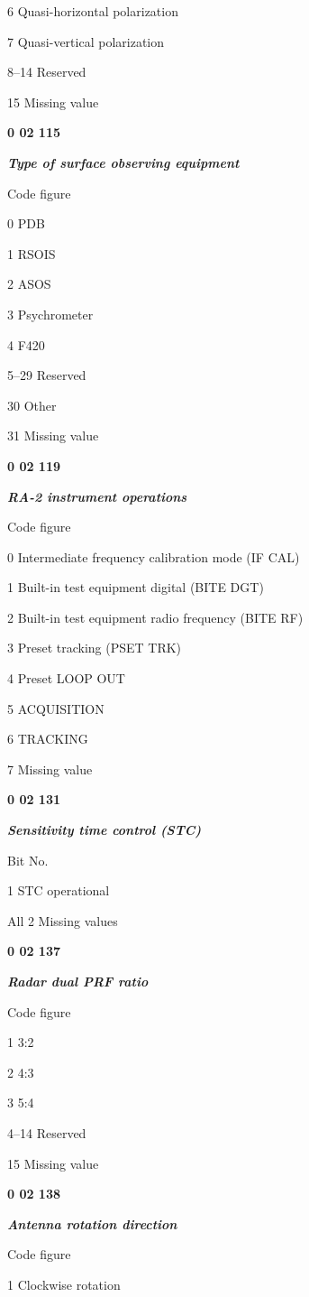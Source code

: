 6 Quasi-horizontal polarization

7 Quasi-vertical polarization

8--14 Reserved

15 Missing value

\textbf{0 02 115}

\emph{\textbf{Type of surface observing equipment}}

Code figure

0 PDB

1 RSOIS

2 ASOS

3 Psychrometer

4 F420

5--29 Reserved

30 Other

31 Missing value

\textbf{0 02 119}

\emph{\textbf{RA-2 instrument operations}}

Code figure

0 Intermediate frequency calibration mode (IF CAL)

1 Built-in test equipment digital (BITE DGT)

2 Built-in test equipment radio frequency (BITE RF)

3 Preset tracking (PSET TRK)

4 Preset LOOP OUT

5 ACQUISITION

6 TRACKING

7 Missing value

\textbf{0 02 131}

\emph{\textbf{Sensitivity time control (STC)}}

Bit No.

1 STC operational

All 2 Missing values

\textbf{0 02 137}

\emph{\textbf{Radar dual PRF ratio}}

Code figure

1 3:2

2 4:3

3 5:4

4--14 Reserved

15 Missing value

\textbf{0 02 138}

\emph{\textbf{Antenna rotation direction}}

Code figure

1 Clockwise rotation

